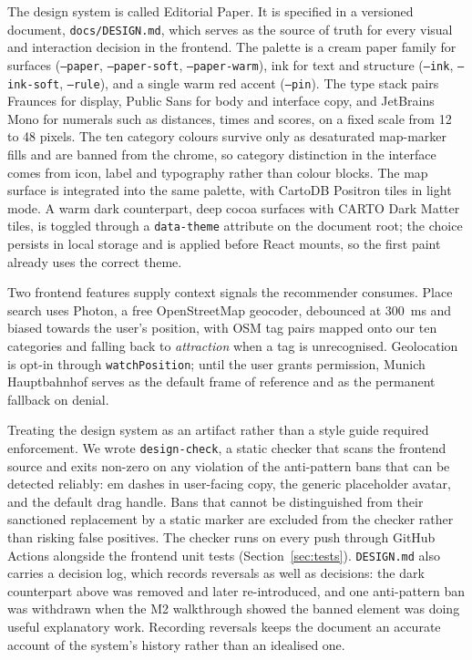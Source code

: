 \documentclass[acmlarge]{acmart}
\begin{document}
The design system is called Editorial Paper. It is specified in a versioned
document, \texttt{docs/DESIGN.md}, which serves as the source of truth for
every visual and interaction decision in the frontend. The palette is a
cream paper family for surfaces (\texttt{--paper}, \texttt{--paper-soft},
\texttt{--paper-warm}), ink for text and structure (\texttt{--ink},
\texttt{--ink-soft}, \texttt{--rule}), and a single warm red accent
(\texttt{--pin}). The type stack pairs Fraunces for display, Public Sans
for body and interface copy, and JetBrains Mono for numerals such as
distances, times and scores, on a fixed scale from 12 to 48 pixels. The ten
category colours survive only as desaturated map-marker fills and are
banned from the chrome, so category distinction in the interface comes from
icon, label and typography rather than colour blocks. The map surface is integrated into the same palette, with CartoDB Positron
tiles in light mode. A warm dark counterpart, deep cocoa surfaces with
CARTO Dark Matter tiles, is toggled through a \texttt{data-theme} attribute
on the document root; the choice persists in local storage and is applied
before React mounts, so the first paint already uses the correct theme.

Two frontend features supply context signals the recommender consumes.
Place search uses Photon, a free OpenStreetMap geocoder, debounced at
300~ms and biased towards the user's position, with OSM tag pairs mapped
onto our ten categories and falling back to \emph{attraction} when a tag is
unrecognised. Geolocation is opt-in through \texttt{watchPosition}; until
the user grants permission, Munich Hauptbahnhof serves as the default frame
of reference and as the permanent fallback on denial.

Treating the design system as an artifact rather than a style guide
required enforcement. We wrote \texttt{design-check}, a static checker that
scans the frontend source and exits non-zero on any violation of the
anti-pattern bans that can be detected reliably: em dashes in user-facing
copy, the generic placeholder avatar, and the default drag handle. Bans
that cannot be distinguished from their sanctioned replacement by a static
marker are excluded from the checker rather than risking false
positives. The checker runs on
every push through GitHub Actions alongside the frontend unit tests
(Section~\ref{sec:tests}). \texttt{DESIGN.md} also carries a decision log,
which records reversals as well as decisions: the dark counterpart above
was removed and later re-introduced, and one anti-pattern ban was withdrawn
when the M2 walkthrough showed the banned element was doing useful
explanatory work. Recording reversals keeps the document an accurate account of the
system's history rather than an idealised one.
\end{document}
